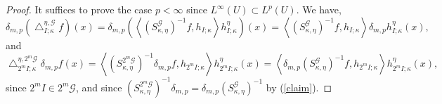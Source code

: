 \documentclass{amsart}%
\theoremstyle{plain}
\numberwithin{equation}{section}
\begin{document}
\begin{proof}
It suffices to prove the case $p<\infty$ since $L^{\infty}\left(  U\right)
\subset L^{p}\left(  U\right)  $. We have,%
\begin{equation}
\delta_{m,p}\left(  \bigtriangleup_{I;\kappa}^{\eta,\mathcal{G}}f\right)
\left(  x\right)  =\delta_{m,p}\left(  \left\langle \left(  S_{\kappa,\eta
}^{\mathcal{G}}\right)  ^{-1}f,h_{I;\kappa}\right\rangle h_{I;\kappa}^{\eta
}\right)  \left(  x\right)  =\left\langle \left(  S_{\kappa,\eta}%
^{\mathcal{G}}\right)  ^{-1}f,h_{I;\kappa}\right\rangle \delta_{m,p}%
h_{I;\kappa}^{\eta}\left(  x\right)  ,\label{one}%
\end{equation}
and%
\begin{equation}
\bigtriangleup_{2^{m}I;\kappa}^{\eta,2^{m}\mathcal{G}}\delta_{m,p}f\left(
x\right)  =\left\langle \left(  S_{\kappa,\eta}^{2^{m}\mathcal{G}}\right)
^{-1}\delta_{m,p}f,h_{2^{m}I;\kappa}\right\rangle h_{2^{m}I;\kappa}^{\eta
}\left(  x\right)  =\left\langle \delta_{m,p}\left(  S_{\kappa,\eta
}^{\mathcal{G}}\right)  ^{-1}f,h_{2^{m}I;\kappa}\right\rangle h_{2^{m}%
I;\kappa}^{\eta}\left(  x\right)  ,\label{two}%
\end{equation}
since $2^{m}I\in2^{m}\mathcal{G}$, and since $\left(  S_{\kappa,\eta}%
^{2^{m}\mathcal{G}}\right)  ^{-1}\delta_{m,p}=\delta_{m,p}\left(
S_{\kappa,\eta}^{\mathcal{G}}\right)  ^{-1}$ by (\ref{claim}).


\end{proof}
\end{document}
